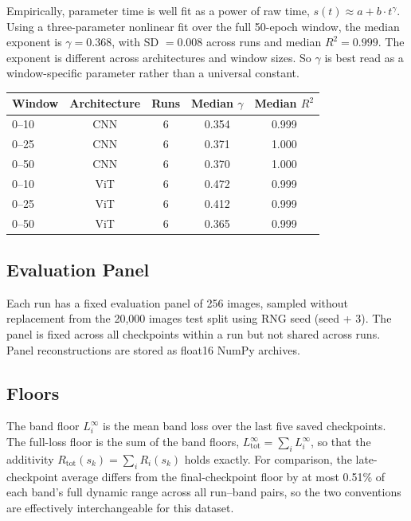 \documentclass{article}
\begin{document}
Empirically, parameter time is well fit as a power of raw time,
$s(t) \approx a + b \cdot t^\gamma$. Using a three-parameter nonlinear
fit over the full 50-epoch window, the median exponent is
$\gamma = 0.368$, with SD $= 0.008$ across runs and median
$R^2 = 0.999$. The exponent is different across architectures and window sizes.
So $\gamma$ is best read as a window-specific parameter rather
than a universal constant.

\begin{center}
\small
\begin{tabular}{@{}lcccc@{}}
\toprule
Window & Architecture & Runs & Median $\gamma$ & Median $R^2$ \\
\midrule
0--10  & CNN & 6 & 0.354 & 0.999 \\
0--25  & CNN & 6 & 0.371 & 1.000 \\
0--50  & CNN & 6 & 0.370 & 1.000 \\
0--10  & ViT & 6 & 0.472 & 0.999 \\
0--25  & ViT & 6 & 0.412 & 0.999 \\
0--50  & ViT & 6 & 0.365 & 0.999 \\
\bottomrule
\end{tabular}
\end{center}

\subsection{Evaluation Panel}\label{app:evaluation-panel}

Each run has a fixed evaluation panel of 256 images, sampled without
replacement from the 20,000 images test split using RNG seed (seed + 3).
The panel is fixed across all checkpoints within a run but not shared
across runs. Panel reconstructions are stored as float16 NumPy archives.

\subsection{Floors}\label{app:floors}

The band floor $L_i^\infty$ is the mean band loss over the last five
saved checkpoints. The full-loss floor is the sum of the band floors,
$L_{\mathrm{tot}}^\infty=\sum_i L_i^\infty$, so that the additivity
$R_{\mathrm{tot}}(s_k)=\sum_i R_i(s_k)$ holds exactly. For comparison,
the late-checkpoint average differs from the final-checkpoint floor by
at most 0.51\% of each band's full dynamic range across all run--band
pairs, so the two conventions are effectively interchangeable for this
dataset.
\end{document}
